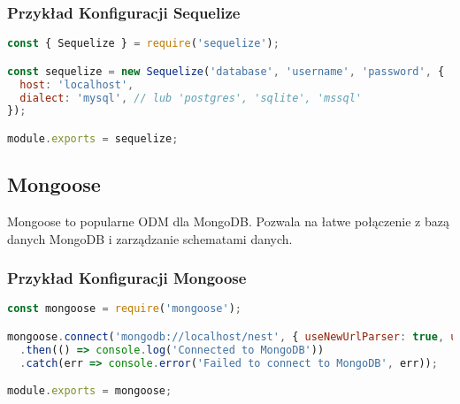 \documentclass[a4paper,12pt]{article}
\begin{document}
\subsubsection{Przykład Konfiguracji Sequelize}
\begin{lstlisting}[language=JavaScript, caption=Konfiguracja Sequelize w Node.js]
const { Sequelize } = require('sequelize');

const sequelize = new Sequelize('database', 'username', 'password', {
  host: 'localhost',
  dialect: 'mysql', // lub 'postgres', 'sqlite', 'mssql'
});

module.exports = sequelize;
\end{lstlisting}

\subsection{Mongoose}
Mongoose to popularne ODM dla MongoDB. Pozwala na łatwe połączenie z bazą danych MongoDB i zarządzanie schematami danych.

\subsubsection{Przykład Konfiguracji Mongoose}
\begin{lstlisting}[language=JavaScript, caption=Konfiguracja Mongoose w Node.js]
const mongoose = require('mongoose');

mongoose.connect('mongodb://localhost/nest', { useNewUrlParser: true, useUnifiedTopology: true })
  .then(() => console.log('Connected to MongoDB'))
  .catch(err => console.error('Failed to connect to MongoDB', err));

module.exports = mongoose;
\end{lstlisting}
\end{document}
